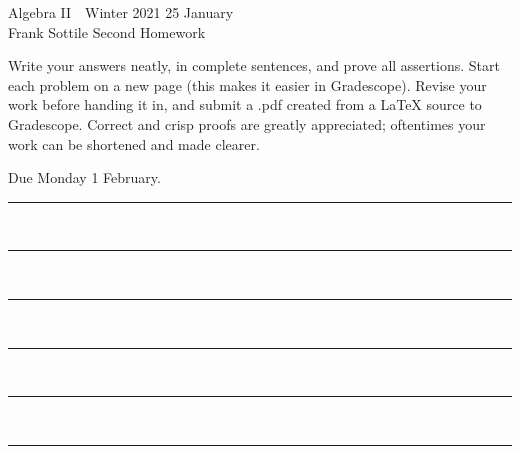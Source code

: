 \documentclass[12pt]{article}
\newcommand{\barsl}{\noindent\begin{minipage}[t]{575pt}
{\color{violet}\rule{575pt}{1.2pt}}\vspace{-5.7mm}\\
{\color{blue}\rule{575pt}{1.2pt}}\vspace{-5.7mm}\\
{\color{green}\rule{575pt}{1.2pt}}\vspace{-5.7mm}\\
{\color{yellow}\rule{575pt}{1.2pt}}\vspace{-5.7mm}\\
{\color{orange}\rule{575pt}{1.2pt}}\vspace{-5.7mm}\\
{\color{red}\rule{575pt}{1.2pt}}
\end{minipage}}
\begin{document}
\LARGE 
\noindent
Algebra II\ \ Winter 2021 \hfill 25 January\makebox[40pt][l]{\ }\\
Frank Sottile \hfill
\Large\sf
Second Homework\makebox[40pt][l]{\ }\\
\normalsize

\noindent
Write your answers neatly, in complete sentences, and prove all assertions.
Start each problem on a new page (this makes it easier in Gradescope).
Revise your work before handing it in, and submit a .pdf  created from a LaTeX source to Gradescope.
Correct and crisp proofs are greatly appreciated; oftentimes your work can be shortened and made clearer.

{\color{red}Due Monday 1 February.}\newline
\vspace{-5pt}

\barsl
\end{document}
